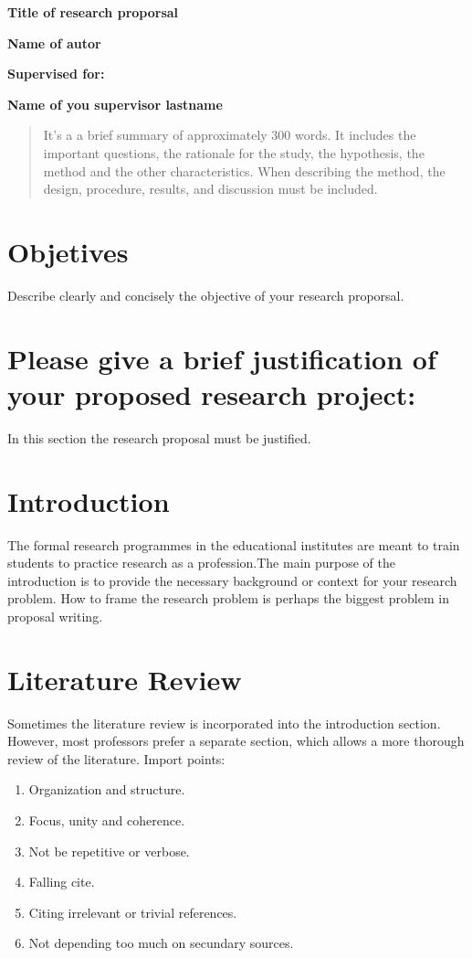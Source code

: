 \documentclass[a4paper, 12pt]{article}
\newcommand{\Tittle}[1]{ {\Huge \bfseries{ #1 }}  }
\newcommand{\subTittle}[1]{ {\Large \bfseries{ #1 }}  }
\begin{document}
\ttfamily %
\begin{center}

	\Tittle{Title of research proporsal} \par
	\subTittle{Name of autor}  \par
	\subTittle{Supervised for:} \par
	\subTittle{Name of you supervisor }\textbf{\Large lastname} \newline
\end{center}

\begin{abstract}
	It's a a brief summary of approximately 300 words. It includes the important questions, the rationale for the study, the hypothesis, the method and the other characteristics. When describing the method, the design, procedure, results, and discussion must be included.
\end{abstract}


\section{Objetives}
Describe clearly and concisely the objective of your research proporsal.
\section{Please give a brief justification of your proposed research project:}
In this section the research proposal must be justified.
\section{Introduction}
The formal research programmes in the educational institutes are meant to train students to practice
research as a profession.The main purpose of the introduction is to provide the necessary background or
context for your research problem. How to frame the research problem is perhaps
the biggest problem in proposal writing.
\section{Literature  Review}
Sometimes the literature review is incorporated into the introduction section.
However, most professors prefer a separate section, which allows a more thorough
review of the literature.
\newline Import points:
\begin{enumerate}
	\item Organization and structure.
	\item Focus, unity and coherence.
	\item Not be repetitive or verbose.
	\item Falling cite.
	\item Citing irrelevant or trivial references.
	\item Not depending too much on secundary sources.
\end{enumerate}
\end{document}
